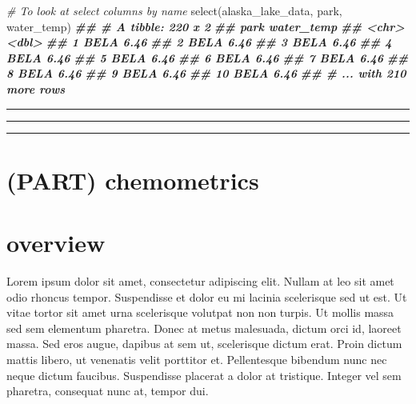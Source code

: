 \documentclass[
]{krantz}
\newenvironment{Shaded}{\begin{snugshade}}{\end{snugshade}}
\newcommand{\CommentTok}[1]{\textcolor[rgb]{0.56,0.35,0.01}{\textit{#1}}}
\newcommand{\DocumentationTok}[1]{\textcolor[rgb]{0.56,0.35,0.01}{\textbf{\textit{#1}}}}
\newcommand{\FunctionTok}[1]{\textcolor[rgb]{0.00,0.00,0.00}{#1}}
\newcommand{\NormalTok}[1]{#1}
\begin{document}
\begin{Shaded}
\begin{Highlighting}[]
\CommentTok{\# To look at select columns by name}
\FunctionTok{select}\NormalTok{(alaska\_lake\_data, park, water\_temp)}
\DocumentationTok{\#\# \# A tibble: 220 x 2}
\DocumentationTok{\#\#    park  water\_temp}
\DocumentationTok{\#\#    \textless{}chr\textgreater{}      \textless{}dbl\textgreater{}}
\DocumentationTok{\#\#  1 BELA        6.46}
\DocumentationTok{\#\#  2 BELA        6.46}
\DocumentationTok{\#\#  3 BELA        6.46}
\DocumentationTok{\#\#  4 BELA        6.46}
\DocumentationTok{\#\#  5 BELA        6.46}
\DocumentationTok{\#\#  6 BELA        6.46}
\DocumentationTok{\#\#  7 BELA        6.46}
\DocumentationTok{\#\#  8 BELA        6.46}
\DocumentationTok{\#\#  9 BELA        6.46}
\DocumentationTok{\#\# 10 BELA        6.46}
\DocumentationTok{\#\# \# ... with 210 more rows}
\end{Highlighting}
\end{Shaded}

\begin{center}\rule{0.5\linewidth}{0.5pt}\end{center}

\begin{center}\rule{0.5\linewidth}{0.5pt}\end{center}

\begin{center}\rule{0.5\linewidth}{0.5pt}\end{center}

\hypertarget{part-chemometrics}{%
\section{(PART) chemometrics}\label{part-chemometrics}}

\hypertarget{overview}{%
\section{overview}\label{overview}}

Lorem ipsum dolor sit amet, consectetur adipiscing elit. Nullam at leo sit amet odio rhoncus tempor. Suspendisse et dolor eu mi lacinia scelerisque sed ut est. Ut vitae tortor sit amet urna scelerisque volutpat non non turpis. Ut mollis massa sed sem elementum pharetra. Donec at metus malesuada, dictum orci id, laoreet massa. Sed eros augue, dapibus at sem ut, scelerisque dictum erat. Proin dictum mattis libero, ut venenatis velit porttitor et. Pellentesque bibendum nunc nec neque dictum faucibus. Suspendisse placerat a dolor at tristique. Integer vel sem pharetra, consequat nunc at, tempor dui.
\end{document}
